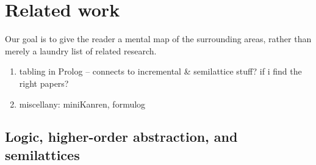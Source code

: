 \chapter{Related work}

Our goal is to give the reader a mental map of the surrounding areas, rather than merely a laundry list of related research.

\noindent{}
\begin{enumerate}[nosep]
\item tabling in Prolog -- connects to incremental \& semilattice stuff? if i find the right papers?
\item miscellany: miniKanren, formulog
\end{enumerate}






\section{Logic, higher-order abstraction, and semilattices}
\label{section-datafun-relatives}

